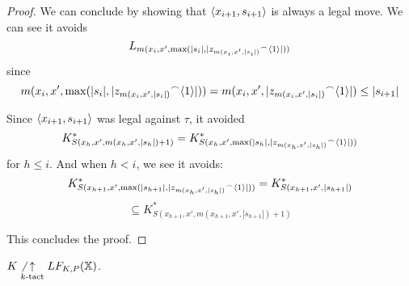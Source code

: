 \begin{proof}
We can conclude by showing that $\langle x_{i+1},s_{i+1}\rangle$ is always a legal move. We can see it avoids 
  \[
  L_{m(x_{i},x',\max(|s_{i}|,|{z_{m(x_i,x',|s_i|)}}^\frown\langle1\rangle|))}
  \]
since
  \[
    m(x_{i},x',\max(|s_{i}|,|{z_{m(x_i,x',|s_i|)}}^\frown\langle1\rangle|)) =
    m(x_{i},x',|{z_{m(x_i,x',|s_i|)}}^\frown\langle1\rangle|) \leq
    |s_{i+1}|
  \]

Since $\langle x_{i+1},s_{i+1}\rangle$ was legal against $\tau$, it avoided
  \[
    K^*_{S(x_h,x',m(x_h,x',|s_h|)+1)} = 
    K^*_{S(x_h,x',\max(|s_h|,|{z_{m(x_h,x',|s_h|)}}^\frown\langle1\rangle|))}
  \]
for $h\leq i$. And when $h<i$, we see it avoids:
  \[
    K^*_{S(x_{h+1},x',\max(|s_{h+1}|,|{z_{m(x_h,x',|s_h|)}}^\frown\langle1\rangle|))} =
    K^*_{S(x_{h+1},x',|s_{h+1}|)}
  \]
  \[
    \subseteq
    K^*_{S(x_{h+1},x',m(x_{h+1},x',|s_{h+1}|)+1)}
  \]

This concludes the proof.
\end{proof}

\begin{thm}
$K\not\underset{k\text{-tact}}{\uparrow}LF_{K,P}(\mathbb{X})$.
\end{thm}


